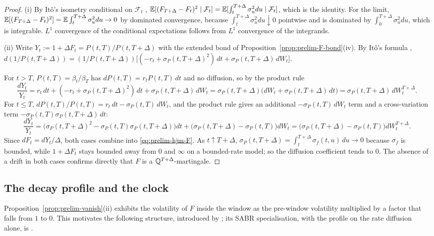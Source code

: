 \documentclass[../../../main.tex]{subfiles}
\begin{document}
\begin{proof}
(i) By It\^o's isometry conditional on $\mathcal F_t$ \cite[Ch.~3, \S2]{karatzas1991}, $\mathbb{E}[(F_{T+\Delta}-F_t)^2\mid\mathcal F_t]=\mathbb{E}[\int_t^{T+\Delta}\sigma_u^2du\mid\mathcal F_t]$, which is the identity. For the limit, $\mathbb{E}[(F_{T+\Delta}-F_t)^2]=\mathbb{E}\int_t^{T+\Delta}\sigma_u^2du\to0$ by dominated convergence, because $\int_t^{T+\Delta}\sigma_u^2du\downarrow0$ pointwise and is dominated by $\int_0^{T+\Delta}\sigma_u^2du$, which is integrable. $L^1$ convergence of the conditional expectations follows from $L^1$ convergence of the integrands.

(ii) Write $Y_t:=1+\Delta F_t=P(t,T)/P(t,T+\Delta)$ with the extended bond of Proposition~\ref{prop:prelim-F-bond}(iv). By It\^o's formula \cite[Thm.~3.3.6]{karatzas1991}, $d(1/P(t,T+\Delta))=(1/P(t,T+\Delta))\big[(-r_t+\sigma_P(t,T+\Delta)^2)\,dt+\sigma_P(t,T+\Delta)\,dW_t\big]$.

For $t>T$, $P(t,T)=\beta_t/\beta_T$ has $dP(t,T)=r_tP(t,T)\,dt$ and no diffusion, so by the product rule
\[
\frac{dY_t}{Y_t}=r_t\,dt+(-r_t+\sigma_P(t,T+\Delta)^2)\,dt+\sigma_P(t,T+\Delta)\,dW_t=\sigma_P(t,T+\Delta)\big(dW_t+\sigma_P(t,T+\Delta)\,dt\big)=\sigma_P(t,T+\Delta)\,dW^{T+\Delta}_t .
\]
For $t\le T$, $dP(t,T)/P(t,T)=r_t\,dt-\sigma_P(t,T)\,dW_t$, and the product rule gives an additional $-\sigma_P(t,T)\,dW_t$ term and a cross-variation term $-\sigma_P(t,T)\sigma_P(t,T+\Delta)\,dt$:
\[
\frac{dY_t}{Y_t}=\big(\sigma_P(t,T+\Delta)^2-\sigma_P(t,T)\sigma_P(t,T+\Delta)\big)dt+\big(\sigma_P(t,T+\Delta)-\sigma_P(t,T)\big)dW_t
=\big(\sigma_P(t,T+\Delta)-\sigma_P(t,T)\big)dW^{T+\Delta}_t .
\]
Since $dF_t=dY_t/\Delta$, both cases combine into \eqref{eq:prelim-hjm-F}. As $t\uparrow T+\Delta$, $\sigma_P(t,T+\Delta)=\int_t^{T+\Delta}\sigma_f(t,u)\,du\to0$ because $\sigma_f$ is bounded, while $1+\Delta F_t$ stays bounded away from $0$ and $\infty$ on a bounded-rate model; so the diffusion coefficient tends to $0$. The absence of a drift in both cases confirms directly that $F$ is a $\mathbb{Q}^{T+\Delta}$-martingale.
\end{proof}

\subsection{The decay profile and the clock}

Proposition~\ref{prop:prelim-vanish}(ii) exhibits the volatility of $F$ inside the window as the pre-window volatility multiplied by a factor that falls from $1$ to $0$. This motivates the following structure, introduced by \cite{lyashenko2019}; its SABR specialisation, with the profile on the rate diffusion alone, is \cite[eqs.~(3)--(4), p.~4]{willems2020}.
\end{document}
